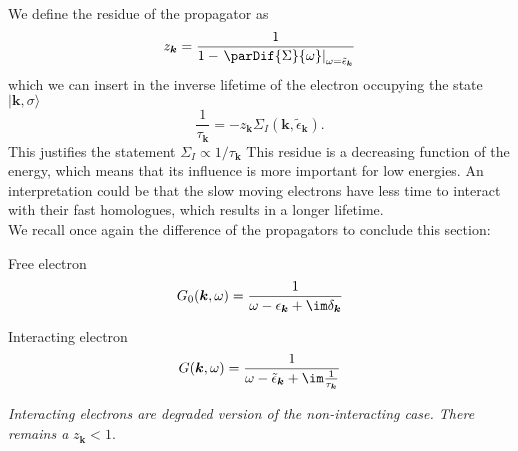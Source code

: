 \documentclass[../main.tex]{subfile}
\begin{document}
We define the residue of the propagator as 
\begin{equation}
    z_{\bm{k}} = \frac{1}{1- \left.\parDif{\Sigma}{\omega}\right|_{\omega = \tilde{\epsilon}_{\bm{k}}}} \label{eq:residue}
\end{equation}
which we can insert in the inverse lifetime of the electron occupying the state $|\bm{k},\sigma\rangle$
\begin{equation}
    \frac{1}{\tau_{\bm{k}}} = - z_{\bm{k}} \Sigma_I(\bm{k}, \tilde{\epsilon}_{\bm{k}}).
\end{equation}
This justifies the statement $ \Sigma_I \propto 1/\tau_{\bm{k}}$
This residue is a decreasing function of the energy, which means that its influence is more important for low energies. 
An interpretation could be that the slow moving electrons have less time to interact with their fast homologues, which results in a
longer lifetime.\\

We recall once again the difference of the propagators to conclude this section:\vspace{12pt}\\
\begin{center}
\begin{minipage}{0.4\textwidth}
    \begin{center}
    Free electron
    \[G_0(\bm{k}, \omega) = \frac{1}{\omega- \epsilon_{\bm{k}}+\im \delta_{\bm{k}}}\]
\end{center}
\end{minipage}
\begin{minipage}{0.05\textwidth}
\end{minipage}
\begin{minipage}{0.4\textwidth}
    \begin{center}
        Interacting electron
    \[G(\bm{k}, \omega) = \frac{1}{\omega- \tilde{\epsilon}_{\bm{k}}+\im \frac{1}{\tau_{\bm{k}}}}\]
    \end{center}
\end{minipage}
\end{center}

\textit{Interacting electrons are degraded version of the non-interacting case. There remains a} $z_{\bm{k}}<1$.\\ 
\end{document}
